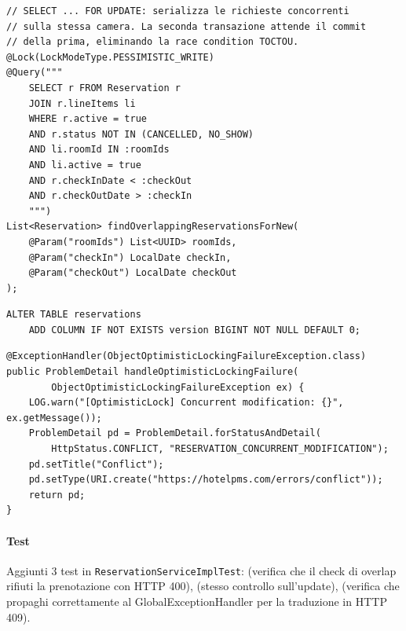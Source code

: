 ﻿\documentclass[a4paper,12pt]{report}
\begin{document}
\begin{securebox}[title={Codice Sicuro --- ReservationRepository.java (feature/secure-coding-hardening)}]
\begin{lstlisting}[style=java]
// SELECT ... FOR UPDATE: serializza le richieste concorrenti
// sulla stessa camera. La seconda transazione attende il commit
// della prima, eliminando la race condition TOCTOU.
@Lock(LockModeType.PESSIMISTIC_WRITE)
@Query("""
    SELECT r FROM Reservation r
    JOIN r.lineItems li
    WHERE r.active = true
    AND r.status NOT IN (CANCELLED, NO_SHOW)
    AND li.roomId IN :roomIds
    AND li.active = true
    AND r.checkInDate < :checkOut
    AND r.checkOutDate > :checkIn
    """)
List<Reservation> findOverlappingReservationsForNew(
    @Param("roomIds") List<UUID> roomIds,
    @Param("checkIn") LocalDate checkIn,
    @Param("checkOut") LocalDate checkOut
);
\end{lstlisting}
\end{securebox}

\begin{securebox}[title={V4\_\_add\_version\_to\_reservations.sql --- Flyway migration}]
\begin{lstlisting}[style=yaml]
ALTER TABLE reservations
    ADD COLUMN IF NOT EXISTS version BIGINT NOT NULL DEFAULT 0;
\end{lstlisting}
\end{securebox}

\begin{securebox}[title={GlobalExceptionHandler.java --- Handler HTTP 409}]
\begin{lstlisting}[style=java]
@ExceptionHandler(ObjectOptimisticLockingFailureException.class)
public ProblemDetail handleOptimisticLockingFailure(
        ObjectOptimisticLockingFailureException ex) {
    LOG.warn("[OptimisticLock] Concurrent modification: {}", ex.getMessage());
    ProblemDetail pd = ProblemDetail.forStatusAndDetail(
        HttpStatus.CONFLICT, "RESERVATION_CONCURRENT_MODIFICATION");
    pd.setTitle("Conflict");
    pd.setType(URI.create("https://hotelpms.com/errors/conflict"));
    return pd;
}
\end{lstlisting}
\end{securebox}

\paragraph{Test} Aggiunti 3 test in \texttt{ReservationServiceImplTest}:
\texttt{} (verifica che il check di overlap
rifiuti la prenotazione con HTTP 400),
\texttt{} (stesso controllo sull'update),
\texttt{} (verifica che
\texttt{} propaghi correttamente
al GlobalExceptionHandler per la traduzione in HTTP 409).
\end{document}
